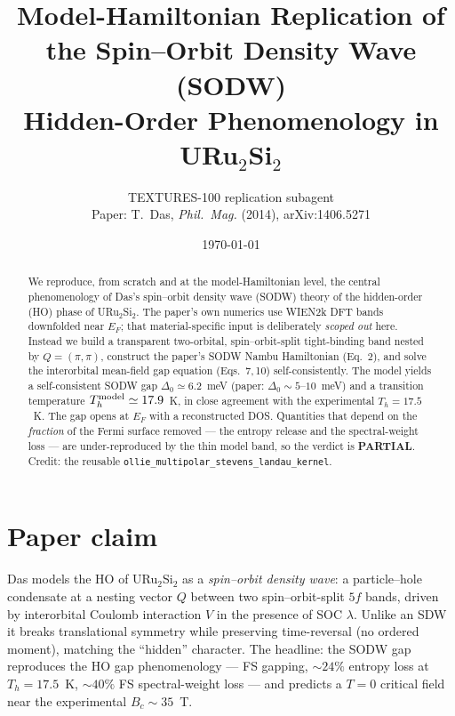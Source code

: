 \documentclass[11pt]{article}
\title{Model-Hamiltonian Replication of the Spin--Orbit Density Wave (SODW)\\
Hidden-Order Phenomenology in URu$_2$Si$_2$}
\author{TEXTURES-100 replication subagent\\
\small Paper: T.\ Das, \emph{Phil.\ Mag.} (2014), arXiv:1406.5271}
\date{\today}
\begin{document}
\maketitle

\begin{abstract}
We reproduce, from scratch and at the model-Hamiltonian level, the central
phenomenology of Das's spin--orbit density wave (SODW) theory of the hidden-order
(HO) phase of URu$_2$Si$_2$. The paper's own numerics use WIEN2k DFT bands
downfolded near $E_F$; that material-specific input is deliberately \emph{scoped
out} here. Instead we build a transparent two-orbital, spin--orbit-split
tight-binding band nested by $Q=(\pi,\pi)$, construct the paper's SODW Nambu
Hamiltonian (Eq.~2), and solve the interorbital mean-field gap equation
(Eqs.~7,\,10) self-consistently. The model yields a self-consistent SODW gap
$\Delta_0\simeq 6.2$~meV (paper: $\Delta_0\sim 5$--$10$~meV) and a transition
temperature $T_h^{\rm model}\simeq 17.9$~K, in close agreement with the
experimental $T_h=17.5$~K. The gap opens at $E_F$ with a reconstructed DOS.
Quantities that depend on the \emph{fraction} of the Fermi surface removed --- the
entropy release and the spectral-weight loss --- are under-reproduced by the thin
model band, so the verdict is \textbf{PARTIAL}. Credit: the reusable
\texttt{ollie\_multipolar\_stevens\_landau\_kernel}.
\end{abstract}

\section{Paper claim}
Das models the HO of URu$_2$Si$_2$ as a \emph{spin--orbit density wave}: a
particle--hole condensate at a nesting vector $Q$ between two spin--orbit-split
$5f$ bands, driven by interorbital Coulomb interaction $V$ in the presence of SOC
$\lambda$. Unlike an SDW it breaks translational symmetry while preserving
time-reversal (no ordered moment), matching the ``hidden'' character. The headline:
the SODW gap reproduces the HO gap phenomenology --- FS gapping, $\sim24\%$
entropy loss at $T_h=17.5$~K, $\sim40\%$ FS spectral-weight loss --- and predicts a
$T=0$ critical field near the experimental $B_c\sim35$~T.
\end{document}
